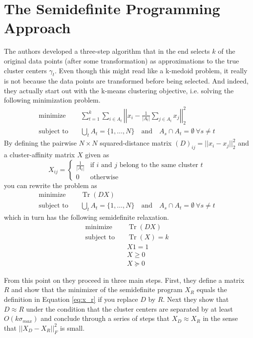 \documentclass[10pt,a4paper]{article}
\DeclareMathOperator{\Tr}{Tr}
\begin{document}
\section{The Semidefinite Programming Approach}
\label{sec:approach}

The authors developed a three-step algorithm that in the end selects $k$ of the original data points (after some transformation) as approximations to the true cluster centers $\gamma_{t}$.
Even though this might read like a k-medoid problem, it really is not because the data points are transformed before being selected.
And indeed, they actually start out with the k-means clustering objective, i.e. solving the following minimization problem.
\begin{align*}
  \text{minimize} \quad & \sum_{t = 1}^{k} \sum_{i \in A_{t}} \left|\left| x_{i} - \frac{1}{|A_{t}|} \sum_{j \in A_{t}} x_{j} \right|\right|_{2}^{2}\\
  \text{subject to} \quad & \bigcup_{t} A_{t} = \{ 1, \dots, N \} \quad \text{and} \quad A_{s} \cap A_{t} = \emptyset~\forall s \ne t
\end{align*}
By defining the pairwise $N \times N$ squared-distance matrix $(D)_{ij} = ||x_{i} - x_{j}||_{2}^{2}$ and a cluster-affinity matrix $X$ given as
\begin{equation}
  X_{ij} = \begin{cases}
    \frac{1}{|A_{t}|} & \text{if $i$ and $j$ belong to the same cluster $t$}\\
    0 & \text{otherwise}
  \end{cases}
  \label{eq:x_r}
\end{equation}
you can rewrite the problem as
\begin{align*}
  \text{minimize} \quad & \Tr(DX)\\
  \text{subject to} \quad & \bigcup_{t} A_{t} = \{ 1, \dots, N \} \quad \text{and} \quad A_{s} \cap A_{t} = \emptyset~\forall s \ne t
\end{align*}
which in turn has the following semidefinite relaxation.
\begin{align*}
  \text{minimize} \quad & \Tr(DX)\\
  \text{subject to} \quad & \Tr(X) = k\\
                        & X1 = 1\\
                        & X \ge 0\\
                        & X \succeq 0
\end{align*}

From this point on they proceed in three main steps.
First, they define a matrix $R$ and show that the minimizer of the semidefinite program $X_{R}$ equals the definition in Equation \eqref{eq:x_r} if you replace $D$ by $R$.
Next they show that $D \approx R$ under the condition that the cluster centers are separated by at least $O(k\sigma_{max})$ and conclude through a series of steps that $X_{D} \approx X_{R}$ in the sense that $||X_{D} - X_{R}||_{F}^{2}$ is small.
\end{document}

